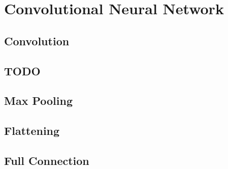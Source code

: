 \chapter{Convolutional Neural Network}
\label{cha:conv}

\section{Convolution}
\label{sec:convolution}

\section{TODO}

\section{Max Pooling}
\label{sec:max-pooling}

\section{Flattening}
\label{sec:flattening}

\section{Full Connection}
\label{sec:full-conn}